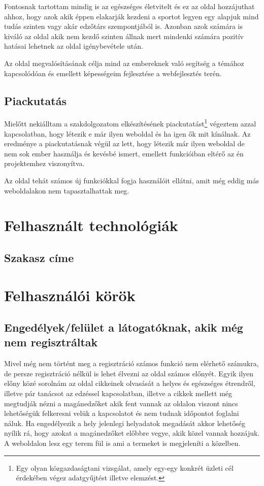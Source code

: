 \documentclass[
]{thesis-ekf}
\theoremstyle{definition}
\theoremstyle{remark}
\begin{document}
	Fontosnak tartottam mindig is az egészséges életvitelt és ez az oldal hozzájuthat ahhoz, hogy azok akik éppen elakarják kezdeni a sportot legyen egy alapjuk mind tudás szinten vagy akár edzőtárs szempontjából is. Azonban azok számára is kiváló az oldal akik nem kezdő szinten állnak mert mindenki számára pozitív hatásai lehetnek az oldal igénybevétele után.
	
	Az oldal megvalósításának célja mind az embereknek való segítség a témához kapcsolódóan és emellett képességeim fejlesztése a webfejlesztés terén.
	
	\section{Piackutatás}
	Mielőtt nekiálltam a szakdolgozatom elkészítésének piackutatást\footnote{Egy olyan közgazdaságtani vizsgálat, amely egy-egy konkrét üzleti cél érdekében végez adatgyűjtést illetve elemzést.} végeztem azzal kapcsolatban, hogy létezik e már ilyen weboldal és ha igen ők mit kínálnak. Az eredménye a piackutatásnak végül az lett, hogy létezik már ilyen weboldal de nem sok ember használja és kevésbé ismert, emellett funkcióiban eltérő az én projektemhez viszonyítva.
	
	Az oldal tehát számos új funkciókkal fogja használóit ellátni, amit még eddig más weboldalakon nem tapasztalhattak meg.
	
	\chapter{Felhasznált technológiák}
	\section{Szakasz címe}
	
	\chapter{Felhasználói körök}
	\section{Engedélyek/felület a látogatóknak, akik még nem regisztráltak}
	Mivel még nem történt meg a regisztráció számos funkció nem elérhető számukra, de persze regisztráció nélkül is lehet élvezni az oldal számos előnyét. Egyik ilyen előny közé sorolnám az oldal cikkeinek olvasását a helyes és egészséges étrendről, illetve pár tanácsot az edzéssel kapcsolatban, illetve a cikkek mellett még megtudják nézni a magánedzőket akik fent vannak az oldalon viszont nincs lehetőségük felkeresni velük a kapcsolatot és nem tudnak időpontot foglalni náluk. Ha engedélyezik a hely jelenlegi helyadatok megadását akkor lehetőség nyílik rá, hogy azokat a magánedzőket előbbre vegye, akik közel vannak hozzájuk. A weboldalon lesz egy terem fül is ami a termeket is megjeleníti a közelben. 
	
\end{document}

